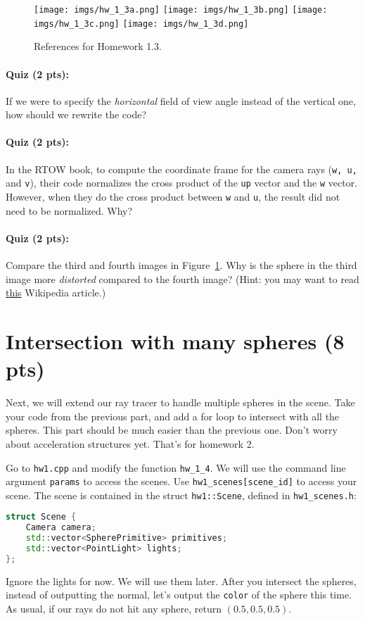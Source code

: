 \begin{figure}[ht]
    \centering
    \texttt{[image: imgs/hw\_1\_3a.png]}
    \texttt{[image: imgs/hw\_1\_3b.png]}
    \texttt{[image: imgs/hw\_1\_3c.png]}
    \texttt{[image: imgs/hw\_1\_3d.png]}
    \caption{References for Homework 1.3.}
    \label{fig:hw_1_3}
\end{figure}

\paragraph{Quiz (2 pts):} If we were to specify the \emph{horizontal} field of view angle instead of the vertical one, how should we rewrite the code?

\paragraph{Quiz (2 pts):} In the RTOW book, to compute the coordinate frame for the camera rays (\lstinline{w, u,} and \lstinline{v}), their code normalizes the cross product of the \lstinline{up} vector and the \lstinline{w} vector. However, when they do the cross product between \lstinline{w} and \lstinline{u}, the result did not need to be normalized. Why?

\paragraph{Quiz (2 pts):} Compare the third and fourth images in Figure~\ref{fig:hw_1_3}. Why is the sphere in the third image more \emph{distorted} compared to the fourth image? (Hint: you may want to read \href{https://en.wikipedia.org/wiki/Perspective_distortion}{this} Wikipedia article.)

\section{Intersection with many spheres (8 pts)}
Next, we will extend our ray tracer to handle multiple spheres in the scene. Take your code from the previous part, and add a for loop to intersect with all the spheres. This part should be much easier than the previous one. Don't worry about acceleration structures yet. That's for homework 2.

Go to \lstinline{hw1.cpp} and modify the function \lstinline{hw_1_4}. We will use the command line argument \lstinline{params} to access the scenes. Use \lstinline{hw1_scenes[scene_id]} to access your scene. The scene is contained in the struct \lstinline{hw1::Scene}, defined in \lstinline{hw1_scenes.h}:
\begin{lstlisting}[language=C++]
struct Scene {
    Camera camera;
    std::vector<SpherePrimitive> primitives;
    std::vector<PointLight> lights; 
};
\end{lstlisting}
Ignore the lights for now. We will use them later. 
After you intersect the spheres, instead of outputting the normal, let's output the \lstinline{color} of the sphere this time. As usual, if our rays do not hit any sphere, return $(0.5, 0.5, 0.5)$.


